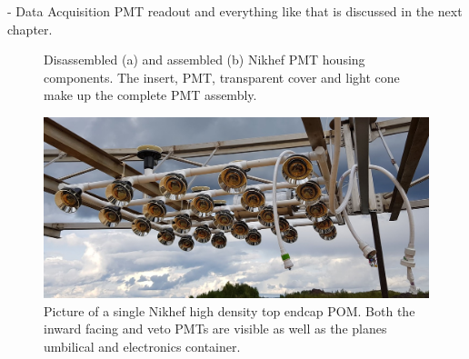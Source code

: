 - Data Acquisition PMT readout and everything like that is discussed in the next chapter.

\begin{figure} %
    \centering
    \quad
    \caption[Disassembled and assembled Nikhef PMT housing components.]
    {Disassembled (a) and assembled (b) Nikhef PMT housing components. The insert, PMT,
        transparent cover and light cone make up the complete PMT assembly.}
\end{figure}

\begin{figure} %
    \includegraphics[width=\textwidth]{diagrams/4-chips/single_plane.jpg}
    \caption[Picture of a Nikhef POM.]
    {Picture of a single Nikhef high density top endcap POM. Both the inward facing and veto PMTs
        are visible as well as the planes umbilical and electronics container.}
    \label{fig:single_plane}
\end{figure}

